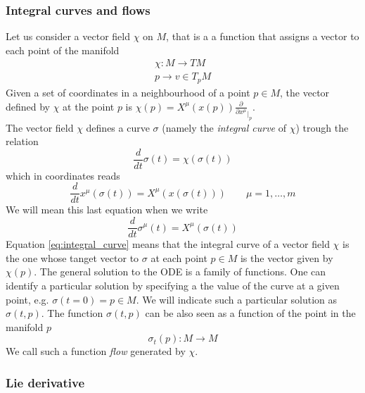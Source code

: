 \documentclass{article}
\begin{document}
\subsubsection*{Integral curves and flows}
Let us consider a vector field $\chi$ on $M$, that is a a function that assigns a vector to each point of the manifold
\begin{gather*}
    \chi: M \to TM \\
    p \to v \in T_pM
\end{gather*}
Given a set of coordinates in a neighbourhood of a point $p \in M$, the vector defined by $\chi$ at the point $p$ is $\chi(p) = X^\mu(x(p)) \frac{\partial}{\partial x^\mu}_{|_p}$. \\
The vector field $\chi$ defines a curve $\sigma$ (namely the \emph{integral curve} of $\chi$) trough the relation
\begin{equation}
    \frac{d}{dt} \sigma(t) = \chi(\sigma(t))
    \label{eq:integral_curve}
\end{equation}
which in coordinates reads
\begin{equation*}
    \frac{d}{dt}x^\mu(\sigma(t)) = X^\mu(x(\sigma(t))) \qquad \mu = 1, \dots, m
\end{equation*}
We will mean this last equation when we write
\begin{equation*}
    \frac{d}{dt}\sigma^\mu(t) = X^\mu(\sigma(t))
\end{equation*}
Equation \ref{eq:integral_curve} means that the integral curve of a vector field $\chi$ is the one whose tanget vector to $\sigma$
at each point $p \in M$ is the vector given by $\chi(p)$. The general solution to the ODE is a family of functions. One can identify 
a particular solution by specifying a the value of the curve at a given point, e.g. $\sigma(t=0) = p \in M$. We will indicate such a particular solution 
as $\sigma(t, p)$. The function $\sigma(t, p)$ can be also seen as a function of the point in the manifold $p$
\begin{equation*}
    \sigma_t(p) : M \to M
\end{equation*}
We call such a function \emph{flow} generated by $\chi$.

\subsubsection*{Lie derivative}
\end{document}
